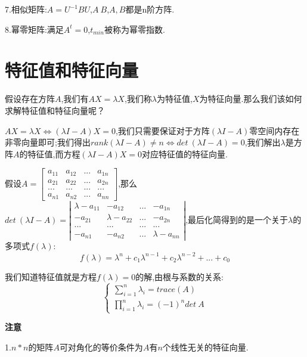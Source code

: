 \documentclass[oneside]{book}
\begin{document}
	7.相似矩阵:$A=U^{-1}BU$,$A~B$,$A,B$都是n阶方阵.
	
	8.幂零矩阵:满足$A^{t}=0$,$t_{min}$被称为幂零指数.
	\chapter{特征值和特征向量}
	
	假设存在方阵$A$,我们有$AX=\lambda X$,我们称$\lambda$为特征值,$X$为特征向量.那么我们该如何求解特征值和特征向量呢？
	
	$AX=\lambda X\Leftrightarrow (\lambda I-A)X=0$,我们只需要保证对于方阵$(\lambda I-A)$零空间内存在非零向量即可;我们得出$rank(\lambda I-A)\neq n\Leftrightarrow det\ (\lambda I-A)=0$,我们解出$\lambda$是方阵$A$的特征值,而方程$(\lambda I-A)X=0$对应特征值的特征向量.
	
	假设$A=\left[\begin{array}{cccc}
		a_{11}&a_{12}&...&a_{1n}\\a_{21}&a_{22}&...&a_{2n}\\...&...&...&...\\a_{n1}&a_{n2}&...&a_{nn}
	\end{array}\right]$,那么$det\ (\lambda I-A)=\left|\begin{array}{cccc}
	\lambda-a_{11}&-a_{12}&...&-a_{1n}\\-a_{21}&\lambda-a_{22}&...&-a_{2n}\\...&...&...&...\\-a_{n1}&-a_{n2}&...&\lambda-a_{nn}
\end{array}\right|$,最后化简得到的是一个关于$\lambda$的多项式$f(\lambda)$:
$$f(\lambda)=\lambda^{n}+c_{1}\lambda^{n-1}+c_{2}\lambda^{n-2}+...+c_{0}$$

我们知道特征值就是方程$f(\lambda)=0$的解,由根与系数的关系:
$$\left\{\begin{array}{c}
	\sum\limits_{i=1}^{n}\lambda_{i}=trace(A)\\ \prod\limits_{i=1}^{n}\lambda_{i}=(-1)^{n}det\ A
\end{array}\right.$$
	
	\textbf{注意}
	
	1.$n*n$的矩阵$A$可对角化的等价条件为$A$有$n$个线性无关的特征向量.
	
\end{document}
